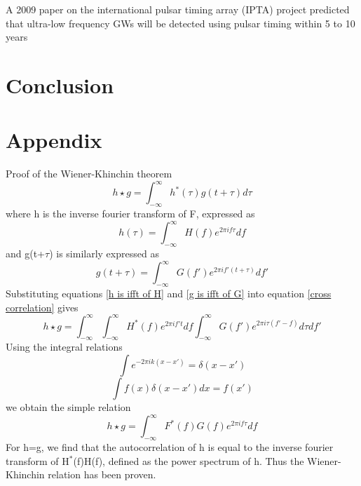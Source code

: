 \documentclass[12pt]{article}
\begin{document}
	
	A 2009 paper on the international pulsar timing array (IPTA) project predicted that ultra-low frequency GWs will be detected using pulsar timing within 5 to 10 years \cite{hobbs2010international}
	
	\section{Conclusion}
	
	\section{Appendix}
	Proof of the Wiener-Khinchin theorem\\
		\begin{equation}\label{cross correlation}
	h \star g=\int_{-\infty}^{\infty}h^{*}(\tau)g(t+\tau)d\tau
	\end{equation}
	where h is the inverse fourier transform of F, expressed as
	\begin{equation}\label{h is ifft of H}
	h(\tau)=\int_{-\infty}^{\infty}H(f)e^{2 \pi i f \tau}df
	\end{equation}
	and g(t+$\tau$) is similarly expressed as 
	\begin{equation}\label{g is ifft of G}
	g(t+\tau)=\int_{-\infty}^{\infty}G(f')e^{2 \pi i f'(t+ \tau)}df'
	\end{equation}
	Substituting equations \ref{h is ifft of H} and \ref{g is ifft of G} into equation \ref{cross correlation} gives
	\begin{equation}\label{cross correlation 2}
	h \star g=\int_{-\infty}^{\infty}\int_{-\infty}^{\infty}H^{*}(f)e^{2 \pi i f't}df \int_{-\infty}^{\infty}G(f')e^{2 \pi i \tau(f'-f)}d\tau df'
	\end{equation}
	Using the integral relations
	\begin{equation}\label{integral relation 1}
	\int e^{-2 \pi i k (x-x')}=\delta(x-x')
	\end{equation}
	\begin{equation}\label{integral relation 2}
	\int f(x)\delta(x-x')dx=f(x')
	\end{equation}
	we obtain the simple relation
	\begin{equation}\label{cross correlation 3}
	h \star g=\int_{-\infty}^{\infty}F^{*}(f)G(f)e^{2 \pi i f\tau}df
	\end{equation}
	For h=g, we find that the autocorrelation of h is equal to the inverse fourier transform of H$^{*}$(f)H(f), defined as the power spectrum of h. Thus the Wiener-Khinchin relation has been proven. 
	
	
\end{document}
